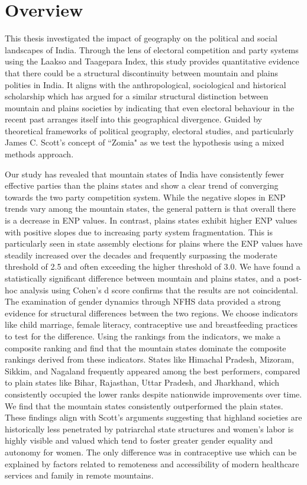\section{Overview}
This thesis investigated the impact of geography on the political and social landscapes of India. Through the lens of electoral competition and party systems using the Laakso and Taagepara Index, this study provides quantitative evidence that there could be a structural discontinuity between mountain and plains polities in India. It aligns with the anthropological, sociological and historical scholarship which has argued for a similar structural distinction between mountain and plains societies by indicating that even electoral behaviour in the recent past arranges itself into this geographical divergence. Guided by  theoretical frameworks of political geography, electoral studies, and particularly James C. Scott's concept of ``Zomia" as we test the hypothesis using a mixed methods approach.


Our study has revealed that mountain states of India have consistently fewer effective parties than the plains states and show a clear trend of converging towards the two party competition system. While the negative slopes in ENP trends vary among the mountain states, the general pattern is that overall there is a decrease in ENP values. In contrast, plains states exhibit higher ENP values with positive slopes due to increasing party system fragmentation. This is particularly seen in state assembly elections for plains where the ENP values have steadily increased over the decades and frequently surpassing the moderate threshold of 2.5 and often exceeding the higher threshold of 3.0. We have found a statistically significant difference between mountain and plains states, and a post-hoc analysis using Cohen’s d score confirms that the results are not coincidental. The examination of gender dynamics through NFHS data provided a strong evidence for structural differences between the two regions. We choose indicators like child marriage, female literacy, contraceptive use and breastfeeding practices to test for the difference.  Using the rankings from the indicators, we make a composite ranking and find that the mountain states dominate the composite rankings derived from these indicators. States like Himachal Pradesh, Mizoram, Sikkim, and Nagaland frequently appeared among the best performers, compared to plain states like Bihar, Rajasthan, Uttar Pradesh, and Jharkhand, which consistently occupied the lower ranks despite nationwide improvements over time. We find that the mountain states consistently outperformed the plain states. These findings align with Scott's arguments suggesting that highland societies are historically less penetrated by patriarchal state structures and women's labor is highly visible and valued which tend to foster greater gender equality and autonomy for women. The only difference was in contraceptive use which can be explained by factors related to remoteness and accessibility of modern healthcare services and family in remote mountains. 


